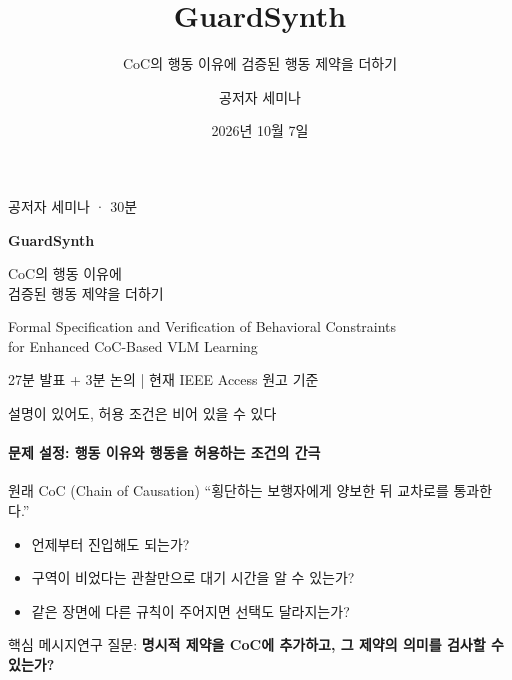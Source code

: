 \documentclass[aspectratio=169,11pt]{beamer}
\title{GuardSynth}
\subtitle{CoC의 행동 이유에 검증된 행동 제약을 더하기}
\author{공저자 세미나}
\date{2026년 10월 7일}
\newcommand{\source}[1]{\par\vspace{2mm}{\fontsize{8}{10}\selectfont\color{muted}근거: #1\par}}
\newcommand{\takeaway}[1]{\begin{block}{핵심 메시지}#1\end{block}}
\begin{document}
\begin{frame}[plain]
  \vspace{4mm}
  {\color{teal}\large 공저자 세미나 · 30분}\par\vspace{5mm}
  {\color{navy}\Huge\bfseries GuardSynth}\par\vspace{3mm}
  {\Large CoC의 행동 이유에\\검증된 행동 제약을 더하기}\par\vspace{5mm}
  {\small Formal Specification and Verification of Behavioral Constraints\\for Enhanced CoC-Based VLM Learning}\par\vfill
  \textcolor{muted}{27분 발표 + 3분 논의 \quad | \quad 현재 IEEE Access 원고 기준}
\end{frame}

\begin{frame}{설명이 있어도, 허용 조건은 비어 있을 수 있다}
  \framesubtitle{문제 설정: 행동 이유와 행동을 허용하는 조건의 간극}
  \begin{block}{원래 CoC (Chain of Causation)}
    “횡단하는 보행자에게 양보한 뒤 교차로를 통과한다.”
  \end{block}
  \begin{itemize}\setlength{\itemsep}{3mm}
    \item 언제부터 진입해도 되는가?
    \item 구역이 비었다는 관찰만으로 대기 시간을 알 수 있는가?
    \item 같은 장면에 다른 규칙이 주어지면 선택도 달라지는가?
  \end{itemize}
  \takeaway{연구 질문: \textbf{명시적 제약을 CoC에 추가하고, 그 제약의 의미를 검사할 수 있는가?}}
  \source{원고 I; IV.A; VI.A--B}
\end{frame}
\end{document}
